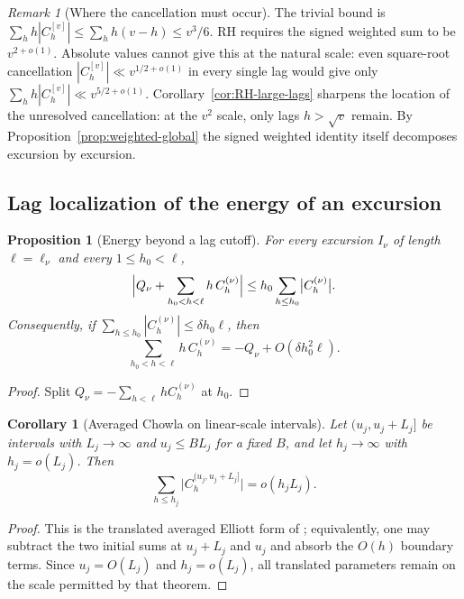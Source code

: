 \documentclass[11pt]{amsart}
\numberwithin{equation}{section}
\theoremstyle{plain}
\newtheorem{proposition}[theorem]{Proposition}
\newtheorem{corollary}[theorem]{Corollary}
\theoremstyle{definition}
\theoremstyle{remark}
\newtheorem{remark}[theorem]{Remark}
\begin{document}
\begin{remark}[Where the cancellation must occur]
\label{rem:cross-lag}
The trivial bound is $\sum_hh|C^{[v]}_h|\le\sum_hh(v-h)\le v^3/6$.
RH requires the signed weighted sum to be $v^{2+o(1)}$. Absolute values
cannot give this at the natural scale: even square-root cancellation
$|C^{[v]}_h|\ll v^{1/2+o(1)}$ in every single lag would give only
$\sum_hh|C^{[v]}_h|\ll v^{5/2+o(1)}$. Corollary~\ref{cor:RH-large-lags}
sharpens the location of the unresolved cancellation: at the $v^2$ scale,
only lags $h>\sqrt v$ remain. By Proposition~\ref{prop:weighted-global} the
signed weighted identity itself decomposes excursion by excursion.
\end{remark}

\subsection{Lag localization of the energy of an excursion}

\begin{proposition}[Energy beyond a lag cutoff]
\label{prop:lag-localization}
For every excursion $I_\nu$ of length $\ell=\ell_\nu$ and every
$1\le h_0<\ell$,
\[
\Bigl|Q_\nu+\sum_{h_0<h<\ell}h\,C^{(\nu)}_h\Bigr|
\le h_0\sum_{h\le h_0}\bigl|C^{(\nu)}_h\bigr| .
\]
Consequently, if $\sum_{h\le h_0}|C^{(\nu)}_h|\le\delta h_0\ell$, then
\[
\sum_{h_0<h<\ell}h\,C^{(\nu)}_h
=-Q_\nu+O(\delta h_0^2\ell).
\]
\end{proposition}

\begin{proof}
Split $Q_\nu=-\sum_{h<\ell}hC^{(\nu)}_h$ at $h_0$.
\end{proof}

\begin{corollary}[Averaged Chowla on linear-scale intervals]
\label{cor:chowla-linear}
Let $(u_j,u_j+L_j]$ be intervals with $L_j\to\infty$ and $u_j\le BL_j$ for a
fixed $B$, and let $h_j\to\infty$ with $h_j=o(L_j)$. Then
\[
\sum_{h\le h_j}\bigl|C^{(u_j,u_j+L_j]}_h\bigr|=o(h_jL_j).
\]
\end{corollary}

\begin{proof}
This is the translated averaged Elliott form of \cite{MRT15}; equivalently,
one may subtract the two initial sums at $u_j+L_j$ and $u_j$ and absorb the
$O(h)$ boundary terms. Since $u_j=O(L_j)$ and $h_j=o(L_j)$, all translated
parameters remain on the scale permitted by that theorem.
\end{proof}
\end{document}
